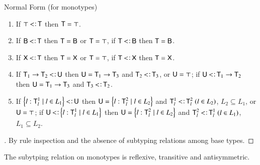 \documentclass{report}
\begin{document}
  \begin{thm}{Normal Form (for monotypes)}
    \begin{enumerate}
      \item If $\top\subtype\type{T}$ then $\textsf{T}=\top$.
      \item If $\type{B}\subtype\type{T}$ then $\textsf{T}=\textsf{B}$ or $\textsf{T}=\top$,
        if $\type{T}\subtype\type{B}$ then $\textsf{T}=\textsf{B}$.
      \item If $\type{X}\subtype\type{T}$ then $\textsf{T}=\textsf{X}$ or $\textsf{T}=\top$,
        if $\type{T}\subtype\type{X}$ then $\textsf{T}=\textsf{X}$.
      \item If $\type{T}_1\fun\type{T}_2\subtype\type{U}$ then
        $\textsf{U}=\textsf{T}_1\rightarrow\textsf{T}_3$ and $\type{T}_2\subtype\type{T}_3$, or $\textsf{U}=\top$;
        if $\type{U}\subtype\type{T}_1\fun\type{T}_2$
        then $\textsf{U}=\textsf{T}_1\rightarrow\textsf{T}_3$ and $\type{T}_3\subtype\type{T}_2$.
      \item If $\set{l : \type{T}_l^1 \mid l \in L_1}\subtype\type{U}$
        then $\textsf{U}=\left\{l : \textsf{T}_l^2 \mid l \in L_2\right\}$
        and $\type{T}_l^1 \subtype \type{T}_l^2 \ (l \in L_2)$, $L_2 \subseteq L_1$,
        or $\textsf{U}=\top$;
        if $\type{U}\subtype\set{l : \type{T}_l^1 \mid l \in L_1}$
        then $\textsf{U}=\left\{l : \textsf{T}_l^2 \mid l \in L_2\right\}$
        and $\type{T}_l^2 \subtype \type{T}_l^1 \ (l \in L_1)$, $L_1 \subseteq L_2$.
    \end{enumerate}
  \end{thm}
  \begin{proof}[]
  	By rule inspection and the absence of subtyping relations among base
	types.
  \end{proof}
  \begin{thm}
    The subytping relation on monotypes is reflexive, transitive and
    antisymmetric.
  \end{thm}
\end{document}
